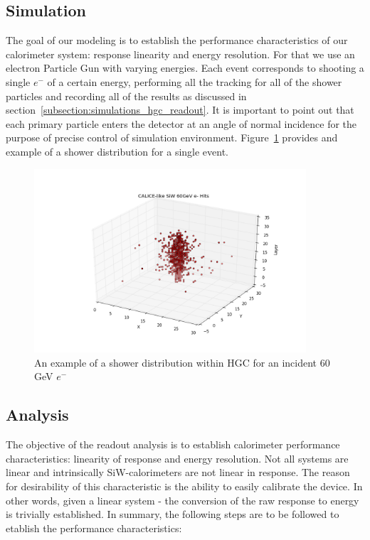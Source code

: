\subsection{Simulation}
The goal of our modeling is to establish the performance characteristics of our calorimeter system: response linearity and energy resolution. For that we use an electron Particle Gun with varying energies. Each event corresponds to shooting a single $e^-$ of a certain energy, performing all the tracking for all of the shower particles and recording all of the results as discussed in section~\ref{subsection:simulations_hgc_readout}. It is important to point out that each primary particle enters the detector at an angle of normal incidence for the purpose of precise control of simulation environment. Figure~\ref{fig:simulations_hgc_scatter60} provides and example of a shower distribution for a single event.
\begin{figure}[!h]
    \centering
    \includegraphics[width=0.9\textwidth]{figures/ch_simulations/hgc/scatter_3d/scatter_3D_60GeV.png}
    \caption{An example of a shower distribution within HGC for an incident 60 GeV $e^-$}
    \label{fig:simulations_hgc_scatter60}
 \end{figure}

\subsection{Analysis}
The objective of the readout analysis is to establish calorimeter performance characteristics: linearity of response and energy resolution. Not all systems are linear and intrinsically SiW-calorimeters are not linear in response. The reason for desirability of this characteristic is the ability to easily calibrate the device. In other words, given a linear system - the conversion of the raw response to energy is trivially established. In summary, the following steps are to be followed to etablish the performance characteristics:

